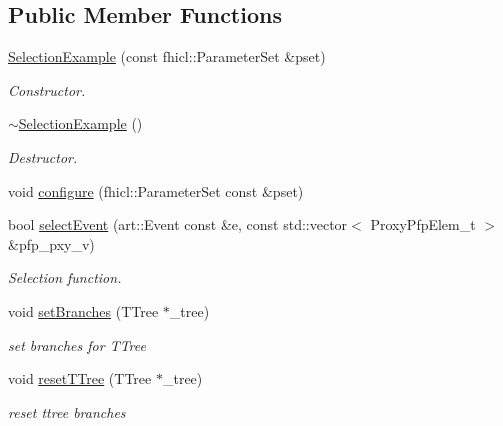 \subsection*{Public Member Functions}
\begin{DoxyCompactItemize}
\item 
\hyperlink{classselection_1_1SelectionExample_a14d995ca3f3beda222bf5eb514fde63f}{Selection\+Example} (const fhicl\+::\+Parameter\+Set \&pset)
\begin{DoxyCompactList}\small\item\em Constructor. \end{DoxyCompactList}\item 
\hyperlink{classselection_1_1SelectionExample_a23080e1af959ccac8b922ebae7dd1d73}{$\sim$\+Selection\+Example} ()\hypertarget{classselection_1_1SelectionExample_a23080e1af959ccac8b922ebae7dd1d73}{}\label{classselection_1_1SelectionExample_a23080e1af959ccac8b922ebae7dd1d73}

\begin{DoxyCompactList}\small\item\em Destructor. \end{DoxyCompactList}\item 
void \hyperlink{classselection_1_1SelectionExample_a93e07083284b112e1881aca28a4205aa}{configure} (fhicl\+::\+Parameter\+Set const \&pset)
\item 
bool \hyperlink{classselection_1_1SelectionExample_a25a0971c86e5b6fb2ce51c16c0a58f9e}{select\+Event} (art\+::\+Event const \&e, const std\+::vector$<$ Proxy\+Pfp\+Elem\+\_\+t $>$ \&pfp\+\_\+pxy\+\_\+v)
\begin{DoxyCompactList}\small\item\em Selection function. \end{DoxyCompactList}\item 
void \hyperlink{classselection_1_1SelectionExample_a6d40ae8dec191b9985338aed2047b1ec}{set\+Branches} (T\+Tree $\ast$\+\_\+tree)\hypertarget{classselection_1_1SelectionExample_a6d40ae8dec191b9985338aed2047b1ec}{}\label{classselection_1_1SelectionExample_a6d40ae8dec191b9985338aed2047b1ec}

\begin{DoxyCompactList}\small\item\em set branches for T\+Tree \end{DoxyCompactList}\item 
void \hyperlink{classselection_1_1SelectionExample_aeca20c0b0258d6a31bf563a9c9728595}{reset\+T\+Tree} (T\+Tree $\ast$\+\_\+tree)\hypertarget{classselection_1_1SelectionExample_aeca20c0b0258d6a31bf563a9c9728595}{}\label{classselection_1_1SelectionExample_aeca20c0b0258d6a31bf563a9c9728595}

\begin{DoxyCompactList}\small\item\em reset ttree branches \end{DoxyCompactList}\end{DoxyCompactItemize}
